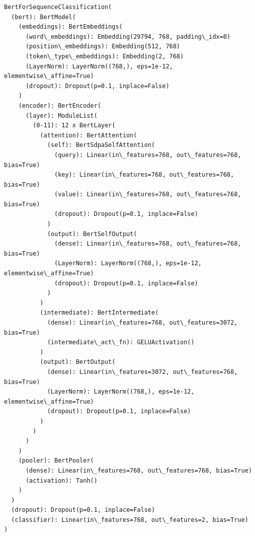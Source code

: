 \documentclass[11pt]{article}
\makeatletter
\newcommand{\boxspacing}{\kern\kvtcb@left@rule\kern\kvtcb@boxsep}
\newcommand{\prompt}[4]{
        {\ttfamily\llap{{\color{#2}[#3]:\hspace{3pt}#4}}\vspace{-\baselineskip}}
    }
\makeatother
\begin{document}
            \begin{tcolorbox}[breakable, size=fbox, boxrule=.5pt, pad at break*=1mm, opacityfill=0]
\prompt{Out}{outcolor}{37}{\boxspacing}
\begin{Verbatim}[commandchars=\\\{\}]
BertForSequenceClassification(
  (bert): BertModel(
    (embeddings): BertEmbeddings(
      (word\_embeddings): Embedding(29794, 768, padding\_idx=0)
      (position\_embeddings): Embedding(512, 768)
      (token\_type\_embeddings): Embedding(2, 768)
      (LayerNorm): LayerNorm((768,), eps=1e-12, elementwise\_affine=True)
      (dropout): Dropout(p=0.1, inplace=False)
    )
    (encoder): BertEncoder(
      (layer): ModuleList(
        (0-11): 12 x BertLayer(
          (attention): BertAttention(
            (self): BertSdpaSelfAttention(
              (query): Linear(in\_features=768, out\_features=768, bias=True)
              (key): Linear(in\_features=768, out\_features=768, bias=True)
              (value): Linear(in\_features=768, out\_features=768, bias=True)
              (dropout): Dropout(p=0.1, inplace=False)
            )
            (output): BertSelfOutput(
              (dense): Linear(in\_features=768, out\_features=768, bias=True)
              (LayerNorm): LayerNorm((768,), eps=1e-12, elementwise\_affine=True)
              (dropout): Dropout(p=0.1, inplace=False)
            )
          )
          (intermediate): BertIntermediate(
            (dense): Linear(in\_features=768, out\_features=3072, bias=True)
            (intermediate\_act\_fn): GELUActivation()
          )
          (output): BertOutput(
            (dense): Linear(in\_features=3072, out\_features=768, bias=True)
            (LayerNorm): LayerNorm((768,), eps=1e-12, elementwise\_affine=True)
            (dropout): Dropout(p=0.1, inplace=False)
          )
        )
      )
    )
    (pooler): BertPooler(
      (dense): Linear(in\_features=768, out\_features=768, bias=True)
      (activation): Tanh()
    )
  )
  (dropout): Dropout(p=0.1, inplace=False)
  (classifier): Linear(in\_features=768, out\_features=2, bias=True)
)
\end{Verbatim}
\end{tcolorbox}
        
\end{document}
